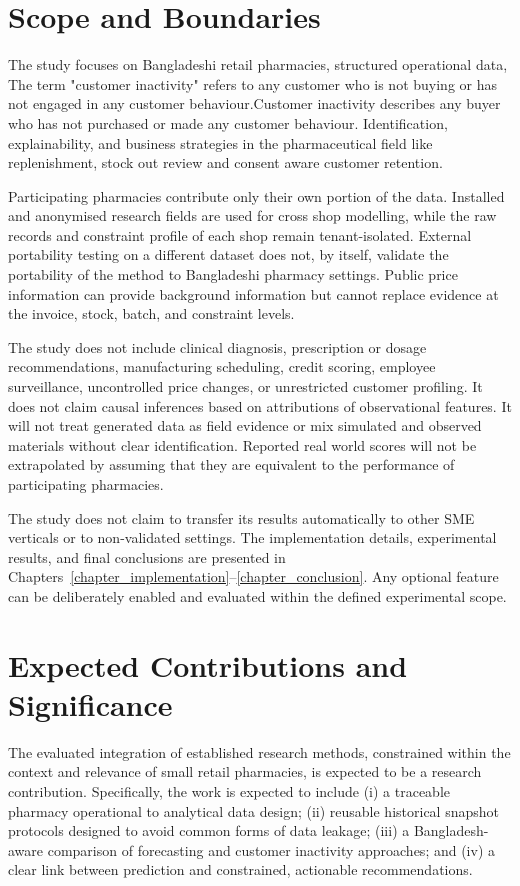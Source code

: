 \documentclass[a4paper,11pt,oneside]{book}
\theoremstyle{plain}
\theoremstyle{definition}
\theoremstyle{remark}
\begin{document}
\section{Scope and Boundaries}

The study focuses on Bangladeshi retail pharmacies, structured operational data,
The term "customer inactivity" refers to any customer who is not buying or has not engaged in any customer behaviour.Customer inactivity describes any buyer who has not purchased or made any customer behaviour.
Identification, explainability, and business strategies in the pharmaceutical field like replenishment,
stock out review and consent aware customer retention.

Participating pharmacies contribute only their own portion of the data. Installed and anonymised research fields are used for cross shop modelling, while the raw records and constraint profile of each shop remain tenant-isolated. External portability testing on a different dataset does not, by itself, validate the portability of the method to Bangladeshi pharmacy settings. Public price information can provide background information but cannot replace evidence at the invoice, stock, batch, and constraint levels.

The study does not include clinical diagnosis, prescription or dosage recommendations, manufacturing scheduling, credit scoring, employee surveillance, uncontrolled price changes, or unrestricted customer profiling. It does not claim causal inferences based on attributions of observational features. It will not treat generated data as field evidence or mix simulated and observed materials without clear identification. Reported real world scores will not be extrapolated by assuming that they are equivalent to the performance of participating pharmacies.

The study does not claim to transfer its results automatically to other SME verticals or to non-validated settings. The implementation details, experimental results, and final conclusions are presented in Chapters~\ref{chapter_implementation}--\ref{chapter_conclusion}. Any optional feature can be deliberately enabled and evaluated within the defined experimental scope.


\section{Expected Contributions and Significance}

The evaluated integration of established research methods, constrained within the context and relevance of small retail pharmacies, is expected to be a research contribution. Specifically, the work is expected to include (i) a traceable pharmacy operational to analytical data design; (ii) reusable historical snapshot protocols designed to avoid common forms of data leakage; (iii) a Bangladesh-aware comparison of forecasting and customer inactivity approaches; and (iv) a clear link between prediction and constrained, actionable recommendations.
\end{document}
